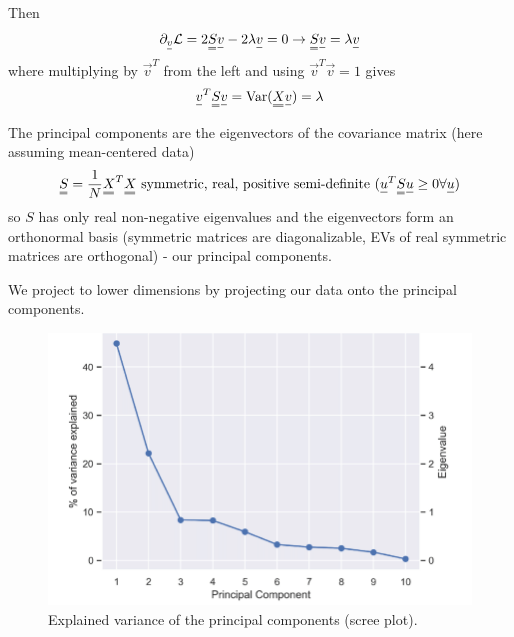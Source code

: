 Then
\begin{equation}
    \partial_{\vec{v}} \mathcal{L} = 2 \mat{S} \vec{v} - 2 \lambda \vec{v} = 0 \rightarrow \mat{S} \vec{v} = \lambda \vec{v}
\end{equation}
where multiplying by $\vec{v}^T$ from the left and using $\vec{v}^T \vec{v} = 1$ gives
\begin{equation}
    \vec{v}^T \mat{S} \vec{v} = \Var(\mat{X}\vec{v}) = \lambda
\end{equation}



The principal components are the eigenvectors of the covariance matrix
(here assuming mean-centered data)
\begin{equation}
    \mat{S} = \frac{1}{N} \mat{X}^T \mat{X} \text{ symmetric, real, positive semi-definite } (\vec{u}^T \mat{S} \vec{u} \geq 0 \forall \vec{u})
\end{equation}
so $S$ has only real non-negative eigenvalues and the eigenvectors form an orthonormal basis
(symmetric matrices are diagonalizable, EVs of real symmetric matrices are orthogonal) - our principal
components.


We project to lower dimensions by projecting our data onto the principal components.


\begin{figure}
    \centering
    \includegraphics[width=.75\textwidth]{figures/var_exp.png}
    \caption{Explained variance of the principal components (scree plot).}
    \label{fig:explained_variance}
\end{figure}

